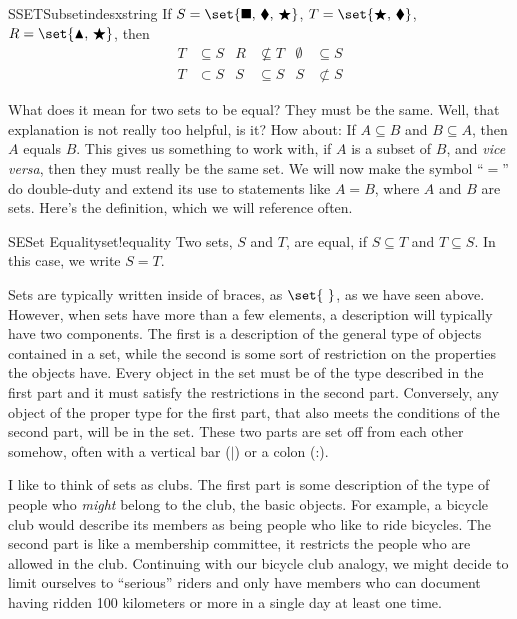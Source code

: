 %
%
\begin{example}{SSET}{Subset}{indesxstring}
If $S=\set{\blacksquare,\,\blacklozenge,\,\bigstar}$, $T=\set{\bigstar,\,\blacklozenge}$, $R=\set{\blacktriangle,\,\bigstar}$, then
%
\begin{align*}
%
T&\subseteq S
&
R&\not\subseteq T
&
\emptyset&\subseteq S
\\
T&\subset S
&
S&\subseteq S
&
S&\not\subset S
%
\end{align*}
%
\end{example}
%
What does it mean for two sets to be equal?  They must be the same.  Well, that explanation is not really too helpful, is it?  How about:  If $A\subseteq B$ and $B\subseteq A$, then $A$ equals $B$.  This gives us something to work with, if $A$ is a subset of $B$, and {\em vice versa}, then they must really be the same set.  We will now make the symbol ``$=$'' do double-duty and extend its use to statements like $A=B$, where $A$ and $B$ are sets.  Here's the definition, which we will reference often.
%
\begin{definition}{SE}{Set Equality}{set!equality}
Two sets, $S$ and $T$, are equal, if $S\subseteq T$ and $T\subseteq S$.  In this case, we write $S=T$.
\end{definition}
%
Sets are typically written inside of braces, as $\set{\ }$, as we have seen above.  However, when sets have more than a few elements, a description will typically have two components.  The first is a description of the general type of objects contained in a set, while the second is some sort of restriction on the properties the objects have.  Every object in the set must be of the type described in the first part and it must satisfy the restrictions in the second part.  Conversely, any object of the proper type for the first part, that also meets the conditions of the second part, will be in the set.  These two parts are set off from each other somehow, often with a vertical bar ($\vert$) or a colon (:).\par
%
I like to think of sets as clubs.  The first part is some description of the type of people who {\em might} belong to the club, the basic objects.  For example, a bicycle club would describe its members as being people who like to ride bicycles.  The second part is like a membership committee, it restricts the people who are allowed in the club.  Continuing with our bicycle club analogy, we might decide to limit ourselves to ``serious'' riders and only have members who can document having ridden 100 kilometers or more in a single day at least one time.\par
